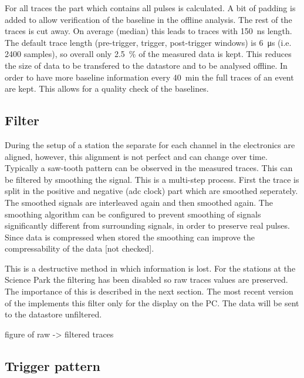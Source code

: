 For all traces the part which contains all pulses is calculated. A bit of padding is added to allow verification of the baseline in the offline analysis. The rest of the traces is cut away. On average (median) this leads to traces with \SI{150}{\nano\second} length. The default trace length (pre-trigger, trigger, post-trigger windows) is \SI{6}{\micro\second} (i.e. 2400 samples), so overall only \SI{2.5}{\percent} of the measured data is kept. This reduces the size of data to be transfered to the datastore and to be analysed offline. In order to have more baseline information every \SI{40}{\minute} the full traces of an event are kept. This allows for a quality check of the baselines.



\subsection{Filter}

During the setup of a station the separate \adcs for each channel in the \hisparc electronics are aligned, however, this alignment is not perfect and can change over time. Typically a saw-tooth pattern can be observed in the measured traces. This can be filtered by smoothing the signal. This is a multi-step process. First the trace is split in the positive and negative (adc clock) part which are smoothed seperately. The smoothed signals are interleaved again and then smoothed again. The smoothing algorithm can be configured to prevent smoothing of signals significantly different from surrounding signals, in order to preserve real pulses. Since data is compressed when stored the smoothing can improve the compressability of the data [not checked].

This is a destructive method in which information is lost. For the \hisparc stations at the Science Park the filtering has been disabled so raw traces values are preserved. The importance of this is described in the next section. The most recent version of the \hisparc \daq [to be released] implements this filter only for the display on the \hisparc PC. The data will be sent to the datastore unfiltered.

figure of raw -> filtered traces


\subsection{Trigger pattern}

